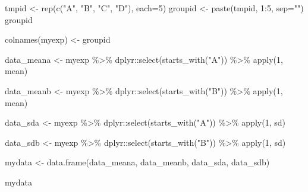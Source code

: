 \documentclass[
]{book}
\newenvironment{Shaded}{\begin{snugshade}}{\end{snugshade}}
\newcommand{\AttributeTok}[1]{\textcolor[rgb]{0.77,0.63,0.00}{#1}}
\newcommand{\DecValTok}[1]{\textcolor[rgb]{0.00,0.00,0.81}{#1}}
\newcommand{\FunctionTok}[1]{\textcolor[rgb]{0.00,0.00,0.00}{#1}}
\newcommand{\NormalTok}[1]{#1}
\newcommand{\OtherTok}[1]{\textcolor[rgb]{0.56,0.35,0.01}{#1}}
\newcommand{\SpecialCharTok}[1]{\textcolor[rgb]{0.00,0.00,0.00}{#1}}
\newcommand{\StringTok}[1]{\textcolor[rgb]{0.31,0.60,0.02}{#1}}
\begin{document}
\begin{Shaded}
\begin{Highlighting}[]
\NormalTok{tmpid }\OtherTok{\textless{}{-}} \FunctionTok{rep}\NormalTok{(}\FunctionTok{c}\NormalTok{(}\StringTok{"A"}\NormalTok{, }\StringTok{"B"}\NormalTok{, }\StringTok{"C"}\NormalTok{, }\StringTok{"D"}\NormalTok{), }\AttributeTok{each=}\DecValTok{5}\NormalTok{)}
\NormalTok{groupid }\OtherTok{\textless{}{-}} \FunctionTok{paste}\NormalTok{(tmpid, }\DecValTok{1}\SpecialCharTok{:}\DecValTok{5}\NormalTok{, }\AttributeTok{sep=}\StringTok{""}\NormalTok{)}
\NormalTok{groupid}

\FunctionTok{colnames}\NormalTok{(myexp) }\OtherTok{\textless{}{-}}\NormalTok{ groupid}

\NormalTok{data\_meana }\OtherTok{\textless{}{-}}\NormalTok{ myexp }\SpecialCharTok{\%\textgreater{}\%} 
\NormalTok{  dplyr}\SpecialCharTok{::}\FunctionTok{select}\NormalTok{(}\FunctionTok{starts\_with}\NormalTok{(}\StringTok{"A"}\NormalTok{)) }\SpecialCharTok{\%\textgreater{}\%} 
  \FunctionTok{apply}\NormalTok{(}\DecValTok{1}\NormalTok{, mean)}
  
\NormalTok{data\_meanb }\OtherTok{\textless{}{-}}\NormalTok{ myexp }\SpecialCharTok{\%\textgreater{}\%} 
\NormalTok{  dplyr}\SpecialCharTok{::}\FunctionTok{select}\NormalTok{(}\FunctionTok{starts\_with}\NormalTok{(}\StringTok{"B"}\NormalTok{)) }\SpecialCharTok{\%\textgreater{}\%} 
  \FunctionTok{apply}\NormalTok{(}\DecValTok{1}\NormalTok{, mean)}
  
\NormalTok{data\_sda }\OtherTok{\textless{}{-}}\NormalTok{ myexp }\SpecialCharTok{\%\textgreater{}\%} 
\NormalTok{  dplyr}\SpecialCharTok{::}\FunctionTok{select}\NormalTok{(}\FunctionTok{starts\_with}\NormalTok{(}\StringTok{"A"}\NormalTok{)) }\SpecialCharTok{\%\textgreater{}\%} 
  \FunctionTok{apply}\NormalTok{(}\DecValTok{1}\NormalTok{, sd)}

\NormalTok{data\_sdb }\OtherTok{\textless{}{-}}\NormalTok{ myexp }\SpecialCharTok{\%\textgreater{}\%} 
\NormalTok{  dplyr}\SpecialCharTok{::}\FunctionTok{select}\NormalTok{(}\FunctionTok{starts\_with}\NormalTok{(}\StringTok{"B"}\NormalTok{)) }\SpecialCharTok{\%\textgreater{}\%} 
  \FunctionTok{apply}\NormalTok{(}\DecValTok{1}\NormalTok{, sd)}

\NormalTok{mydata }\OtherTok{\textless{}{-}} \FunctionTok{data.frame}\NormalTok{(data\_meana,}
\NormalTok{           data\_meanb,}
\NormalTok{           data\_sda,}
\NormalTok{           data\_sdb)}

\NormalTok{mydata}


\end{Highlighting}
\end{Shaded}
\end{document}
